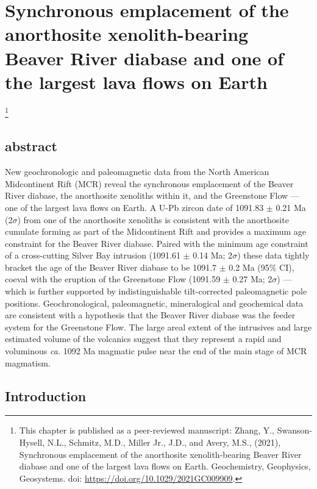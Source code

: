 \chapter[Synchronous emplacement of the anorthosite xenolith-bearing Beaver River diabase and one of the largest lava flows on Earth][Beaver Bay Complex]{Synchronous emplacement of the anorthosite xenolith-bearing Beaver River diabase and one of the largest lava flows on Earth}

\let\thefootnote\relax\footnote{This chapter is published as a peer-reviewed manuscript: Zhang, Y., Swanson-Hysell, N.L., Schmitz, M.D., Miller Jr., J.D., and Avery, M.S., (2021), Synchronous emplacement of the anorthosite xenolith-bearing Beaver River diabase and one of the largest lava flows on Earth. Geochemistry, Geophysics, Geosystems. doi: \url{https://doi.org/10.1029/2021GC009909}.}

\section{abstract}
New geochronologic and paleomagnetic data from the North American Midcontinent Rift (MCR) reveal the synchronous emplacement of the Beaver River diabase, the anorthosite xenoliths within it, and the Greenstone Flow --- one of the largest lava flows on Earth. A U-Pb zircon date of 1091.83 $\pm$ 0.21 Ma (2$\sigma$) from one of the anorthosite xenoliths is consistent with the anorthosite cumulate forming as part of the Midcontinent Rift and provides a maximum age constraint for the Beaver River diabase. Paired with the minimum age constraint of a cross-cutting Silver Bay intrusion (1091.61 $\pm$ 0.14 Ma; 2$\sigma$) these data tightly bracket the age of the Beaver River diabase to be 1091.7 $\pm$ 0.2 Ma (95\% CI), coeval with the eruption of the Greenstone Flow (1091.59 $\pm$ 0.27 Ma; 2$\sigma$) --- which is further supported by indistinguishable tilt-corrected paleomagnetic pole positions. Geochronological, paleomagnetic, mineralogical and geochemical data are consistent with a hypothesis that the Beaver River diabase was the feeder system for the Greenstone Flow. The large areal extent of the intrusives and large estimated volume of the volcanics suggest that they represent a rapid and voluminous \textit{ca.} 1092 Ma magmatic pulse near the end of the main stage of MCR magmatism.

\section{Introduction}

